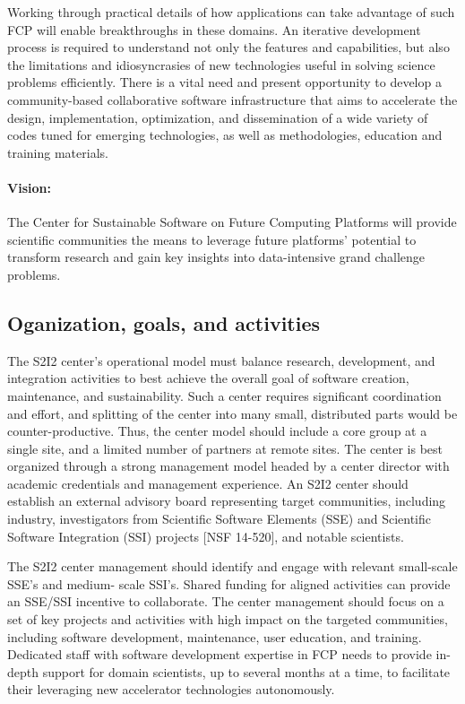 Working through practical details of how applications can take advantage of such FCP will enable breakthroughs in these domains. An iterative development process is required to understand not only the features and capabilities, but also the limitations and idiosyncrasies of new technologies useful in solving science problems efficiently. There is a vital need and present opportunity to develop a community-based collaborative software infrastructure that aims to accelerate the design, implementation, optimization, and dissemination of a wide variety of codes tuned for emerging technologies, as well as methodologies, education and training materials.

\paragraph{Vision:} The Center for Sustainable Software on Future Computing Platforms will provide scientific communities the means to leverage future platforms’ potential to transform research and gain key insights into data-intensive grand challenge problems.


\subsection{Oganization, goals, and activities}
The S2I2 center’s operational model must balance research, development, and integration activities to best achieve the overall goal of software creation, maintenance, and sustainability. Such a center requires significant coordination and effort, and splitting of the center into many small, distributed parts would be counter-productive.  Thus, the center model should include a core group at a single site, and a limited number of partners at remote sites. The center is best organized through a strong management model headed by a center director with academic credentials and management experience. An S2I2 center should establish an external advisory board representing target communities, including industry, investigators from Scientific Software Elements (SSE) and Scientific Software Integration (SSI) projects [NSF 14-520], and notable scientists.

The S2I2 center management should identify and engage with relevant small-scale SSE’s and medium- scale SSI’s. Shared funding for aligned activities can provide an SSE/SSI incentive to collaborate. The center management should focus on a set of key projects and activities with high impact on the targeted communities, including software development, maintenance, user education, and training. Dedicated staff with software development expertise in FCP needs to provide in-depth support for domain scientists, up to several months at a time, to facilitate their leveraging new accelerator technologies autonomously.

